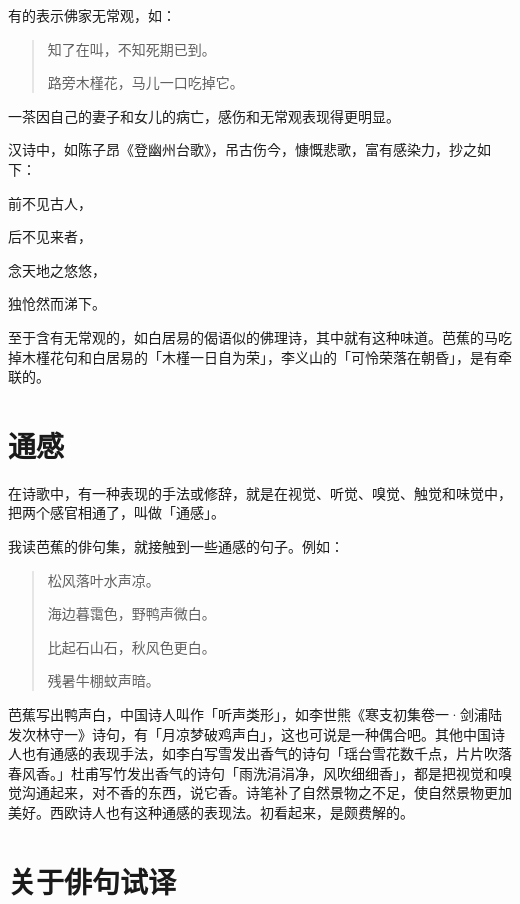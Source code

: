 {  有的表示佛家无常观，如：

  \begin{quote}
      知了在叫，不知死期已到。

      路旁木槿花，马儿一口吃掉它。
  \end{quote}

  一茶因自己的妻子和女儿的病亡，感伤和无常观表现得更明显。

  汉诗中，如陈子昂《登幽州台歌》，吊古伤今，慷慨悲歌，富有感染力，抄之如下：

  \begin{center}
      前不见古人，

      后不见来者，

      念天地之悠悠，

      独怆然而涕下。
  \end{center}

  至于含有无常观的，如白居易的偈语似的佛理诗，其中就有这种味道。芭蕉的马吃掉木槿花句和白居易的「木槿一日自为荣」，李义山的「可怜荣落在朝昏」，是有牵联的。

  \section*{\FS 通感}

  在诗歌中，有一种表现的手法或修辞，就是在视觉、听觉、嗅觉、触觉和味觉中，把两个感官相通了，叫做「通感」。

  我读芭蕉的俳句集，就接触到一些通感的句子。例如：

  \begin{quote}
      松风落叶水声凉。

      海边暮霭色，野鸭声微白。

      比起石山石，秋风色更白。

      残暑牛棚蚊声暗。
  \end{quote}

  芭蕉写出鸭声白，中国诗人叫作「听声类形」，如李世熊《寒支初集卷一·剑浦陆发次林守一》诗句，有「月凉梦破鸡声白」，这也可说是一种偶合吧。其他中国诗人也有通感的表现手法，如李白写雪发出香气的诗句「瑶台雪花数千点，片片吹落春风香。」杜甫写竹发出香气的诗句「雨洗涓涓净，风吹细细香」，都是把视觉和嗅觉沟通起来，对不香的东西，说它香。诗笔补了自然景物之不足，使自然景物更加美好。西欧诗人也有这种通感的表现法。初看起来，是颇费解的。

  \section*{\FS 关于俳句试译}

}
